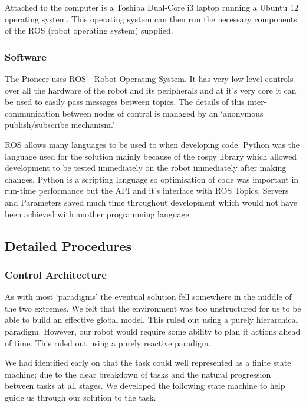 Attached to the computer is a Toshiba Dual-Core i3 laptop running a Ubuntu 12 operating system. This operating system can then run the necessary components of the ROS (robot operating system) supplied.

\subsubsection{Software}

The Pioneer uses ROS - Robot Operating System. It has very low-level controls over all the hardware of the robot and its peripherals and at it’s very core it can be used to easily pass messages between topics. The details of this inter-communication between nodes of control is managed by an ‘anonymous publish/subscribe mechanism.’

ROS allows many languages to be used to when developing code. Python was the language used for the solution mainly because of the rospy \parencite{rospy} library which allowed development to be tested immediately on the robot immediately after making changes. Python is a scripting language so optimisation of code was important in run-time performance but the API and it’s interface with ROS Topics, Servers and Parameters saved much time throughout development which would not have been achieved with another programming language.

\subsection{Detailed Procedures}

\subsubsection{Control Architecture}

As with most ‘paradigms’ the eventual solution fell somewhere in the middle of the two extremes. We felt that the environment was too unstructured for us to be able to build an effective global model. This ruled out using a purely hierarchical paradigm. However, our robot would require some ability to plan it actions ahead of time. This ruled out using a purely reactive paradigm.

We had identified early on that the task could well represented as a finite state machine; due to the clear breakdown of tasks and the natural progression between tasks at all stages. We developed the following state machine to help guide us through our solution to the task.

